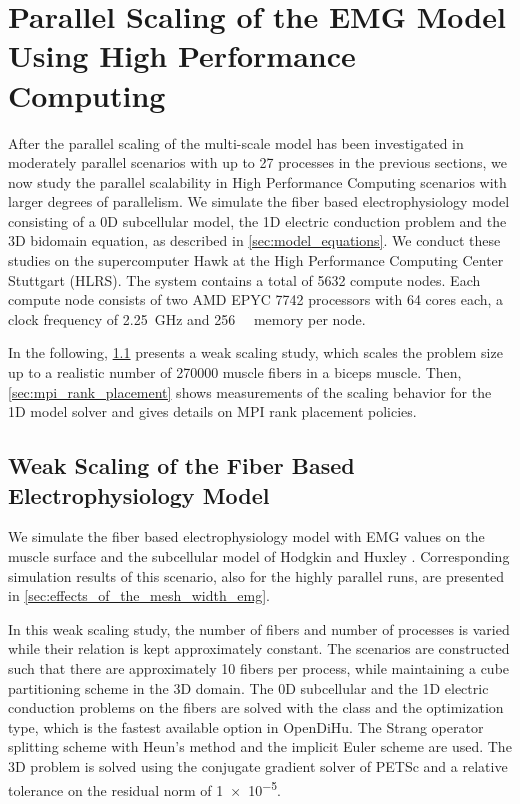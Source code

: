 
%
\section{Parallel Scaling of the EMG Model Using High Performance Computing}\label{sec:hpc_emg}

After the parallel scaling of the multi-scale model has been investigated in moderately parallel scenarios with up to 27 processes in the previous sections, we now study the parallel scalability in High Performance Computing scenarios with larger degrees of parallelism.
We simulate the fiber based electrophysiology model consisting of a 0D subcellular model, the 1D electric conduction problem and the 3D bidomain equation, as described in \cref{sec:model_equations}.
We conduct these studies on the supercomputer Hawk at the High Performance Computing Center Stuttgart (HLRS). The system contains a total of 5632 compute nodes. Each compute node consists of two AMD EPYC 7742 processors with 64 cores each, a clock frequency of \SI{2.25}{\giga\hertz} and \SI{256}{\giga\byte} memory per node.

In the following, \cref{sec:weak_scaling_hawk} presents a weak scaling study, which scales the problem size up to a realistic number of \num{270000} muscle fibers in a biceps muscle.
Then, \cref{sec:mpi_rank_placement} shows measurements of the scaling behavior for the 1D model solver and gives details on MPI rank placement policies.

\subsection{Weak Scaling of the Fiber Based Electrophysiology Model}\label{sec:weak_scaling_hawk}

We simulate the fiber based electrophysiology model with EMG values on the muscle surface and the subcellular model of Hodgkin and Huxley \cite{Hodgkin1952}.
Corresponding simulation results of this scenario, also for the highly parallel runs, are presented in \cref{sec:effects_of_the_mesh_width_emg}.

In this weak scaling study, the number of fibers and number of processes is varied while their relation is kept approximately constant. The scenarios are constructed such that there are approximately 10 fibers per process, while maintaining a cube partitioning scheme in the 3D domain. The 0D subcellular and the 1D electric conduction problems on the fibers are solved with the  class and the  optimization type, which is the fastest available option in OpenDiHu. The Strang operator splitting scheme with Heun's method and the implicit Euler scheme are used. The 3D problem is solved using the conjugate gradient solver of PETSc and a relative tolerance on the residual norm of \num{1e-5}. 

